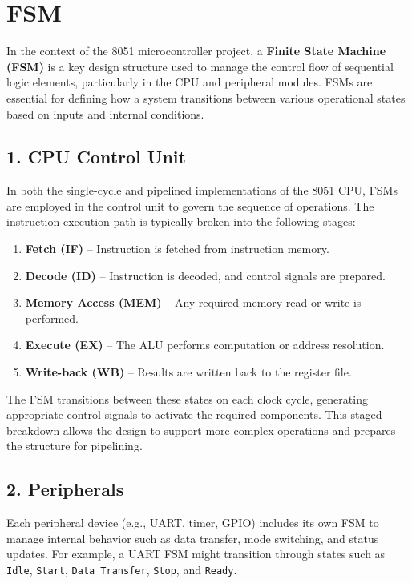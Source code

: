 \section{FSM}


In the context of the 8051 microcontroller project, a \textbf{Finite State Machine (FSM)} is a key design structure used to manage the control flow of sequential logic elements, particularly in the CPU and peripheral modules. FSMs are essential for defining how a system transitions between various operational states based on inputs and internal conditions.

\subsection*{1. CPU Control Unit}

In both the single-cycle and pipelined implementations of the 8051 CPU, FSMs are employed in the control unit to govern the sequence of operations. The instruction execution path is typically broken into the following stages:

\begin{enumerate}
    \item \textbf{Fetch (IF)} – Instruction is fetched from instruction memory.
    \item \textbf{Decode (ID)} – Instruction is decoded, and control signals are prepared.
    \item \textbf{Memory Access (MEM)} – Any required memory read or write is performed.
    \item \textbf{Execute (EX)} – The ALU performs computation or address resolution.
    \item \textbf{Write-back (WB)} – Results are written back to the register file.
\end{enumerate}

The FSM transitions between these states on each clock cycle, generating appropriate control signals to activate the required components. This staged breakdown allows the design to support more complex operations and prepares the structure for pipelining.

\subsection*{2. Peripherals}

Each peripheral device (e.g., UART, timer, GPIO) includes its own FSM to manage internal behavior such as data transfer, mode switching, and status updates. For example, a UART FSM might transition through states such as \texttt{Idle}, \texttt{Start}, \texttt{Data Transfer}, \texttt{Stop}, and \texttt{Ready}.

